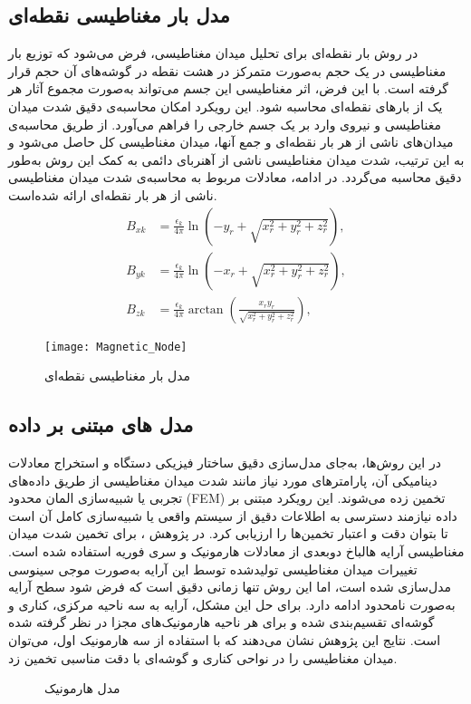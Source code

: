 \subsection{مدل بار مغناطیسی نقطه‌ای}
در روش بار نقطه‌ای برای تحلیل میدان مغناطیسی، فرض می‌شود که توزیع بار مغناطیسی در یک حجم به‌صورت متمرکز در هشت نقطه در گوشه‌های آن حجم قرار گرفته است. با این فرض، اثر مغناطیسی این جسم می‌تواند به‌صورت مجموع آثار هر یک از بارهای نقطه‌ای محاسبه شود. این رویکرد امکان محاسبه‌ی دقیق شدت میدان مغناطیسی و نیروی وارد بر یک جسم خارجی را فراهم می‌آورد. از طریق محاسبه‌ی میدان‌های ناشی از هر بار نقطه‌ای و جمع آنها، میدان مغناطیسی کل حاصل می‌شود و به این ترتیب، شدت میدان مغناطیسی ناشی از آهنربای دائمی به کمک این روش به‌طور دقیق محاسبه می‌گردد. در ادامه، معادلات مربوط به محاسبه‌ی شدت میدان مغناطیسی ناشی از هر بار نقطه‌ای ارائه شده‌است.
\begin{align}
B_{xk} &= \frac{\epsilon_k}{4\pi} \ln\left(-y_r + \sqrt{x_r^2 + y_r^2 + z_r^2}\right), \\
B_{yk} &= \frac{\epsilon_k}{4\pi} \ln\left(-x_r + \sqrt{x_r^2 + y_r^2 + z_r^2}\right), \\
B_{zk} &= \frac{\epsilon_k}{4\pi} \arctan\left( \frac{x_r y_r}{\sqrt{x_r^2 + y_r^2 + z_r^2}} \right),
\end{align}

\begin{figure}[ht]
\centering
\texttt{[image: Magnetic\_Node]}
\caption{مدل بار مغناطیسی نقطه‌ای \cite{RN44}}
\label{figMagnetic_Node}
\end{figure}

\subsection{مدل های مبتنی بر داده}

در این روش‌ها، به‌جای مدل‌سازی دقیق ساختار فیزیکی دستگاه و استخراج معادلات دینامیکی آن، پارامترهای مورد نیاز مانند شدت میدان مغناطیسی از طریق داده‌های تجربی یا شبیه‌سازی المان محدود (FEM) تخمین زده می‌شوند. این رویکرد مبتنی بر داده نیازمند دسترسی به اطلاعات دقیق از سیستم واقعی یا شبیه‌سازی کامل آن است تا بتوان دقت و اعتبار تخمین‌ها را ارزیابی کرد. در پژوهش 
\cite{RN10}
، برای تخمین شدت میدان مغناطیسی آرایه هالباخ دوبعدی از معادلات هارمونیک و سری فوریه استفاده شده است. تغییرات میدان مغناطیسی تولیدشده توسط این آرایه به‌صورت موجی سینوسی مدل‌سازی شده است، اما این روش تنها زمانی دقیق است که فرض شود سطح آرایه به‌صورت نامحدود ادامه دارد. برای حل این مشکل، آرایه به سه ناحیه مرکزی، کناری و گوشه‌ای تقسیم‌بندی شده و برای هر ناحیه هارمونیک‌های مجزا در نظر گرفته شده است. نتایج این پژوهش نشان می‌دهند که با استفاده از سه هارمونیک اول، می‌توان میدان مغناطیسی را در نواحی کناری و گوشه‌ای با دقت مناسبی تخمین زد.

\begin{figure}[ht]
\centering 
{}
\hspace{2mm}
\caption{مدل هارمونیک}
\label{fig:harmonic}
\end{figure}



